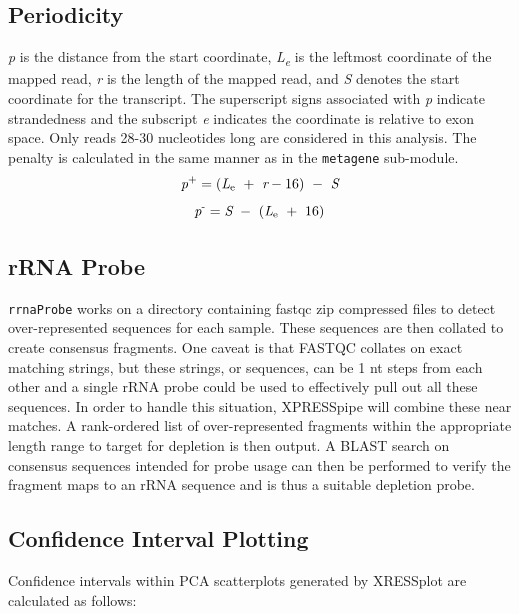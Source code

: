 \documentclass[11pt, a4paper, oneside]{article}
\begin{document}
\subsection{Periodicity}
\textit{p} is the distance from the start coordinate, \textit{L\textsubscript{e}} is the leftmost coordinate of the mapped read, \textit{r} is the length of the mapped read, and \textit{S} denotes the start coordinate for the transcript. The superscript signs associated with \textit{p} indicate strandedness and the subscript \textit{e} indicates the coordinate is relative to exon space. Only reads 28-30 nucleotides long are considered in this analysis. The penalty is calculated in the same manner as in the \texttt{metagene} sub-module.
\begin{equation}
  \textit{p}\textsuperscript{+} = (\textit{L}\textsubscript{e}\ +\ \textit{r} - 16)\ -\ \textit{S}
\end{equation}
\begin{equation}
  \textit{p}\textsuperscript{-} = \textit{S}\ -\ (\textit{L}\textsubscript{e}\ +\ 16)
\end{equation}

\subsection{rRNA Probe}
\texttt{rrnaProbe} works on a directory containing fastqc \cite{fastqc} zip compressed files to detect over-represented sequences for each sample. These sequences are then collated to create consensus fragments. One caveat is that FASTQC collates on exact matching strings, but these strings, or sequences, can be 1 nt steps from each other and a single rRNA probe could be used to effectively pull out all these sequences. In order to handle this situation, XPRESSpipe will combine these near matches. A rank-ordered list of over-represented fragments within the appropriate length range to target for depletion is then output. A BLAST \cite{blast} search on consensus sequences intended for probe usage can then be performed to verify the fragment maps to an rRNA sequence and is thus a suitable depletion probe.

\subsection{Confidence Interval Plotting}
Confidence intervals within PCA scatterplots generated by XRESSplot are calculated as follows:
\end{document}
